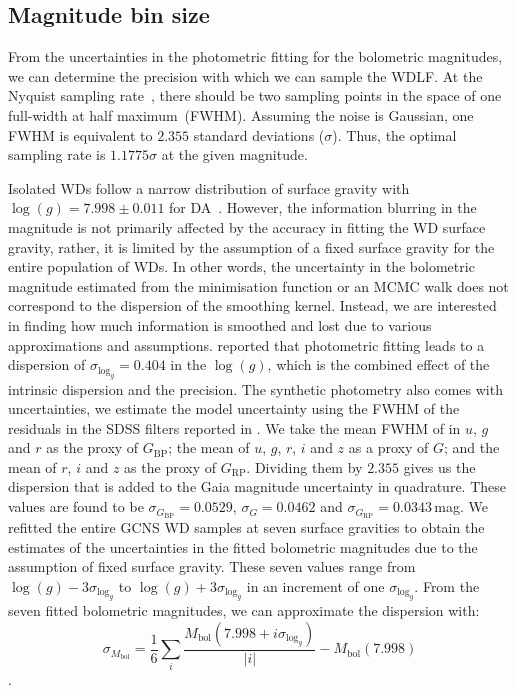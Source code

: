\documentclass[fleqn,usenatbib]{mnras}
\begin{document}
\subsection{Magnitude bin size}
\label{sec:magnitude_bin_size}
From the uncertainties in the photometric fitting for the bolometric magnitudes,
we can determine the precision with which we can sample the WDLF. At the Nyquist
sampling rate~\citep{1949IEEEP..37...10S}, there should be two sampling points
in the space of one full-width at half maximum~(FWHM). Assuming the noise is
Gaussian, one FWHM is equivalent to $2.355$ standard deviations ($\sigma$).
Thus, the optimal sampling rate is $1.1775\sigma$ at the given magnitude.

Isolated WDs follow a narrow distribution of surface gravity with
$\log(g)=7.998 \pm 0.011$ for DA~\citep{2021MNRAS.507.4646K}. However, the
information blurring in the magnitude is not primarily affected by the accuracy
in fitting the WD surface gravity, rather, it is limited by the assumption of a
fixed surface gravity for the entire population of WDs. In other words, the
uncertainty in the bolometric magnitude estimated from the minimisation
function or an MCMC walk does not correspond to the dispersion of the
smoothing kernel. Instead, we are interested in finding how much information
is smoothed and lost due to various approximations and assumptions.
\citet{2014ApJ...796..128G} reported that photometric fitting leads to a
dispersion of $\sigma_{\mathrm{log}_{g}} = 0.404$ in the $\log(g)$, which is
the combined effect of the intrinsic dispersion and the precision. The
synthetic photometry also comes with uncertainties, we estimate the model
uncertainty using the FWHM of the residuals in the SDSS filters reported in
\citet{2006AJ....132.1221H}. We take the mean FWHM of in $u$, $g$ and $r$ as
the proxy of $G_{\mathrm{BP}}$; the mean of $u$, $g$, $r$, $i$ and $z$ as a proxy of
$G$; and the mean of $r$, $i$ and $z$ as the proxy of $G_{\mathrm{RP}}$. Dividing them
by $2.355$ gives us the dispersion that is added to the Gaia magnitude
uncertainty in quadrature. These values are found to be
$\sigma_{G_{\mathrm{BP}}}=0.0529$, $\sigma_{G}=0.0462$ and $\sigma_{G_{\mathrm{RP}}}=0.0343$\,mag.
We refitted the entire GCNS WD samples at seven surface gravities to obtain
the estimates of the uncertainties in the fitted bolometric magnitudes due to
the assumption of fixed surface gravity. These seven values range from
$\log(g) - 3\sigma_{\mathrm{log}_{g}}$ to $\log(g) + 3\sigma_{\mathrm{log}_{g}}$
in an increment of one $\sigma_{\mathrm{log}_{g}}$. From the seven fitted
bolometric magnitudes, we can approximate the dispersion with:
\begin{equation}
  \sigma_{M_{\mathrm{bol}}} = \frac{1}{6}\sum_{i}\frac{M_{\mathrm{bol}}(7.998 + i\sigma_{\mathrm{log}_{g}})}{|i|} - M_{\mathrm{bol}}(7.998)
\end{equation}
.
\end{document}
